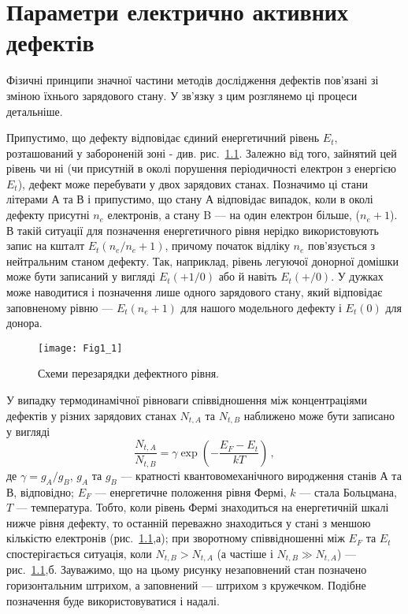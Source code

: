 \chapter{Параметри електрично активних \\ дефектів}\label{chapLevels}
Фізичні принципи значної частини методів дослідження дефектів
пов'язані зі зміною їхнього зарядового стану.
У зв'язку з цим розглянемо ці процеси детальніше.

Припустимо, що дефекту відповідає єдиний енергетичний рівень $E_t$,
розташований у забороненій зоні - див. рис.~\ref{F11}.
Залежно від того, зайнятий цей рівень чи ні (чи присутній в околі
порушення періодичності електрон з енергією $E_t$),
дефект може перебувати у двох зарядових станах.
Позначимо ці стани літерами А та В і припустимо,
що стану А відповідає випадок, коли в околі дефекту присутні $n_e$
електронів, а стану B --- на один електрон більше, ($n_e+1$).
В такій ситуації для позначення енергетичного рівня
нерідко використовують запис на кшталт $E_t(n_e/n_e+1)$,
причому початок відліку $n_e$ пов'язується з нейтральним станом
дефекту.
Так, наприклад, рівень легуючої донорної домішки
може бути записаний у вигляді $E_t(+1/0)$ або й навіть $E_t(+/0)$.
У дужках може наводитися і позначення лише одного зарядового стану,
який відповідає заповненому рівню ---  $E_t(n_e+1)$ для нашого модельного дефекту
і $E_t(0)$ для донора.

\begin{figure}[b]
\center
\vspace{-5mm}
\texttt{[image: Fig1\_1]}
\vspace{-3mm}
\caption{Схеми перезарядки дефектного рівня.}
\vspace{-3mm}
\label{F11}
\end{figure}

У випадку термодинамічної рівноваги співвідношення між концентраціями
дефектів у різних зарядових станах $N_{t,A}$ та $N_{t,B}$
наближено може бути записано у вигляді
\begin{equation}
\label{NbNa}
 \frac{N_{t,A}}{N_{t,B}}=\gamma\exp\left(-\frac{E_F-E_t}{kT}\right)\,,
\end{equation}
де $\gamma=g_{A}/g_{B}$,
 $g_{A}$ та $g_{B}$ --- кратності квантовомеханічного виродження станів А та В,
відповідно;
$E_F$ --- енергетичне положення рівня Фермі,
$k$ --- стала Больцмана,
$T$ --- температура.
Тобто, коли рівень Фермі знаходиться на енергетичній шкалі нижче рівня дефекту,
то останній переважно знаходиться у стані з меншою кількістю електронів (рис.~\ref{F11},а);
при зворотному співвідношенні між  $E_F$ та $E_t$  спостерігається ситуація,
коли $N_{t,B}>N_{t,A}$ (а частіше і $N_{t,B}\gg N_{t,A}$) --- рис.~\ref{F11},б.
Зауважимо, що на цьому рисунку незаповнений стан позначено горизонтальним штрихом,
а заповнений --- штрихом з кружечком.
Подібне позначення буде використовуватися і надалі.


